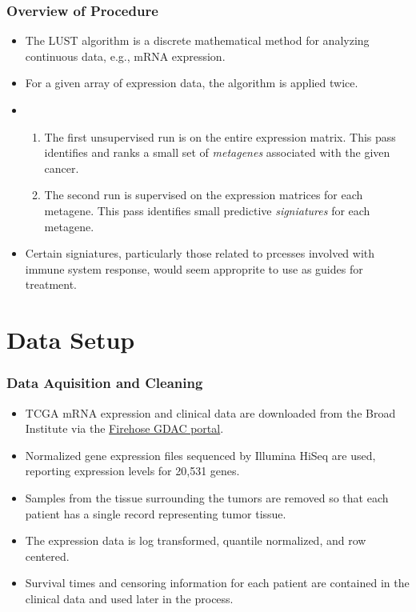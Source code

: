 \documentclass[
	11pt, %
]{beamer}
\begin{document}
\begin{frame}
	\frametitle{Overview of Procedure}
	
	\begin{itemize}
        \item The LUST algorithm is a discrete mathematical method for analyzing continuous data, e.g., mRNA expression.
        \pause
        \item For a given array of expression data, the algorithm is applied twice.
        \pause
        \item 
        \begin{enumerate}
            \item The first unsupervised run is on the entire expression matrix. This pass identifies and ranks a small set of \emph{metagenes} associated with the given cancer.
            \pause
            \item The second run is supervised on the expression matrices for each metagene. This pass identifies small predictive \emph{signiatures} for each metagene.
        \end{enumerate}
        \pause
        \item Certain signiatures, particularly those related to prcesses involved with immune system response, would seem approprite to use as guides for treatment.
    \end{itemize}
\end{frame}


\section{Data Setup}

\begin{frame}
	\frametitle{Data Aquisition and Cleaning}
	
	\begin{itemize}
        \item TCGA mRNA expression and clinical data are downloaded from the Broad Institute via the \href{https://gdac.broadinstitute.org/}{Firehose GDAC portal}.
        \pause
        \item Normalized gene expression files sequenced by Illumina HiSeq are used, reporting expression levels for 20,531 genes.
        \pause
        \item Samples from the tissue surrounding the tumors are removed so that each patient has a single record representing tumor tissue.
        \pause
        \item The expression data is log transformed, quantile normalized, and row centered.
        \pause
        \item Survival times and censoring information for each patient are contained in the clinical data and used later in the process.
    \end{itemize}
\end{frame}
\end{document}
